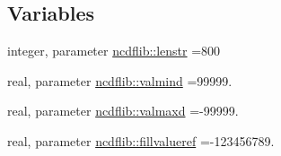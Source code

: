 \subsection*{Variables}
\begin{DoxyCompactItemize}
\item 
integer, parameter \mbox{\hyperlink{namespacencdflib_a7d52315e1d9f473093f6f8fa245ea084}{ncdflib\+::lenstr}} =800
\item 
real, parameter \mbox{\hyperlink{namespacencdflib_a71ee1a8194dbe6077a815f191502a2ea}{ncdflib\+::valmind}} =99999.
\item 
real, parameter \mbox{\hyperlink{namespacencdflib_aa581bf8880e7253521fd20a58fe85464}{ncdflib\+::valmaxd}} =-\/99999.
\item 
real, parameter \mbox{\hyperlink{namespacencdflib_a2dd9900bbac81773f270bfe083fdfbe7}{ncdflib\+::fillvalueref}} =-\/123456789.
\end{DoxyCompactItemize}
